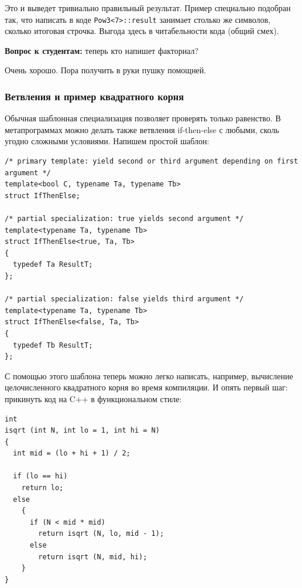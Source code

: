 \documentclass[a4paper,12pt,oneside]{article}
\newif\ifanswers
\begin{document}
Это и выведет тривиально правильный результат. Пример специально подобран так, что написать в коде \lstinline!Pow3<7>::result! занимает столько же символов, сколько итоговая строчка. Выгода здесь в читабельности кода (общий смех). 

\textbf{Вопрос к студентам:} теперь кто напишет факториал?

\ifanswers
Ответ:

\begin{lstlisting}
template <int n>
struct factorial 
{
  enum { value = n * factorial<n - 1>::value };
};
 
template <>
struct factorial<0> {
  enum { value = 1 };
};
\end{lstlisting}
\fi

Очень хорошо. Пора получить в руки пушку помощней.

\subsubsection{Ветвления и пример квадратного корня}\label{TemplateIfElse}

Обычная шаблонная специализация позволяет проверять только равенство. В метапрограммах можно делать также ветвления if-then-else с любыми, сколь угодно сложными условиями. Напишем простой шаблон:

\begin{lstlisting}
/* primary template: yield second or third argument depending on first argument */
template<bool C, typename Ta, typename Tb> 
struct IfThenElse; 

/* partial specialization: true yields second argument */
template<typename Ta, typename Tb> 
struct IfThenElse<true, Ta, Tb> 
{ 
  typedef Ta ResultT; 
}; 

/* partial specialization: false yields third argument */
template<typename Ta, typename Tb> 
struct IfThenElse<false, Ta, Tb> 
{ 
  typedef Tb ResultT; 
}; 
\end{lstlisting}

С помощью этого шаблона теперь можно легко написать, например, вычисление целочисленного квадратного корня во время компиляции.
И опять первый шаг: прикинуть код на C++ в функциональном стиле:

\begin{lstlisting}
int
isqrt (int N, int lo = 1, int hi = N)
{
  int mid = (lo + hi + 1) / 2;

  if (lo == hi)
    return lo;
  else
    {
      if (N < mid * mid)
        return isqrt (N, lo, mid - 1);
      else
        return isqrt (N, mid, hi);
    }
}
\end{lstlisting}
\end{document}
